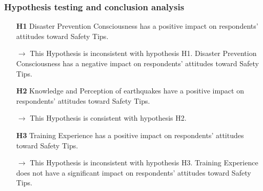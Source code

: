 \begin{table}[h]
  \caption{Discriminant Validity }
  \label{table36}
  \centering
{}
\end{table}

\subsubsection{Hypothesis testing and conclusion analysis}
\begin{itemize}
\item[\textbf{H1}] Disaster Prevention Consciousness has a positive impact on respondents' attitudes toward Safety Tips.
\item[\textbf{$\longrightarrow$}] This Hypothesis is inconsistent with hypothesis H1. Disaster Prevention Consciousness has a negative impact on respondents' attitudes toward Safety Tips.
\item[\textbf{H2}] Knowledge and Perception of earthquakes have a positive impact on respondents' attitudes toward Safety Tips.
\item[\textbf{$\longrightarrow$}] This Hypothesis is consistent with hypothesis H2. 
\item[\textbf{H3}] Training Experience has a positive impact on respondents' attitudes toward Safety Tips.
\item[\textbf{$\longrightarrow$}] This Hypothesis is inconsistent with hypothesis H3. Training Experience does not have a significant impact on respondents' attitudes toward Safety Tips.
\end{itemize}


